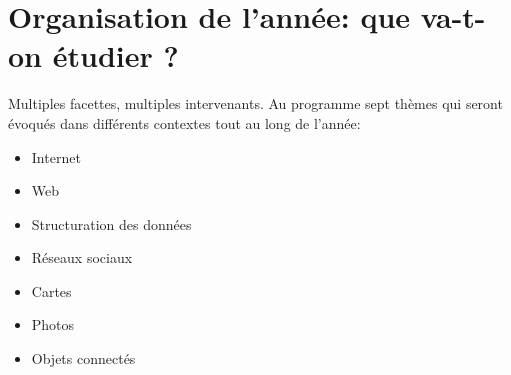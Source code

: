 \documentclass[french]{beamer}
\begin{document}
\section{Organisation de l'année: que va-t-on étudier ?}

\begin{frame}
\protect\hypertarget{organisation-de-lannuxe9e-que-va-t-on-uxe9tudier}{}

Multiples facettes, multiples intervenants. Au programme sept thèmes qui
seront évoqués dans différents contextes tout au long de l'année:

\begin{itemize}
\tightlist
\item
  Internet
\item
  Web
\item
  Structuration des données
\item
  Réseaux sociaux
\item
  Cartes
\item
  Photos
\item
  Objets connectés
\end{itemize}

\end{frame}
\end{document}
